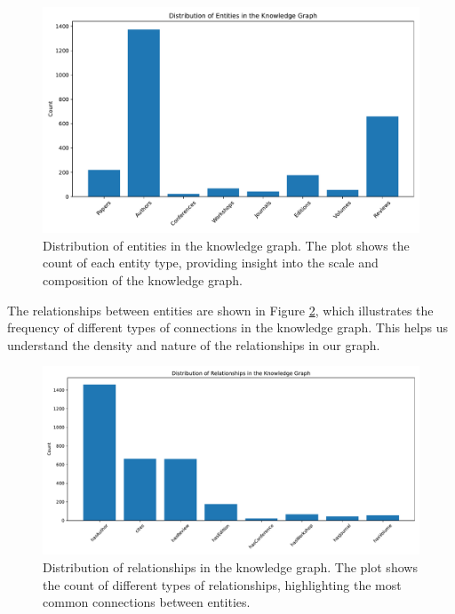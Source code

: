 \documentclass[10pt,a4paper]{article}
\begin{document}
\begin{figure}[H]
    \centering
    \includegraphics[width=\textwidth]{img/entity_distribution.pdf}
    \caption{Distribution of entities in the knowledge graph. The plot shows the count of each entity type, providing insight into the scale and composition of the knowledge graph.}
    \label{fig:entity_dist}
\end{figure}

The relationships between entities are shown in Figure \ref{fig:relationship_dist}, which illustrates the frequency of different types of connections in the knowledge graph. This helps us understand the density and nature of the relationships in our graph.

\begin{figure}[H]
    \centering
    \includegraphics[width=\textwidth]{img/relationship_distribution.pdf}
    \caption{Distribution of relationships in the knowledge graph. The plot shows the count of different types of relationships, highlighting the most common connections between entities.}
    \label{fig:relationship_dist}
\end{figure}
\end{document}
